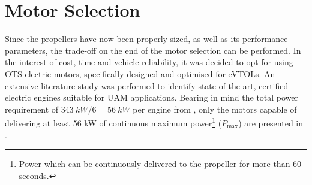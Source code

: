 \section{Motor Selection}
\label{sec:engineschoice}
Since the propellers have now been properly sized, as well as its performance parameters, the trade-off on the end of the motor selection can be performed.
In the interest of cost, time and vehicle reliability, it was decided to opt for using OTS electric motors, specifically designed and optimised for eVTOLs.
An extensive literature study was performed to identify state-of-the-art, certified electric engines suitable for UAM applications.
Bearing in mind the total power requirement of $\qty{343}{kW}/6=\qty{56}{kW}$ per engine from ,
only the motors capable of delivering at least 56 kW of continuous maximum power\footnote{Power which can be continuously delivered to the propeller for more than 60 seconds.} ($P_{\max}$) are presented in .

